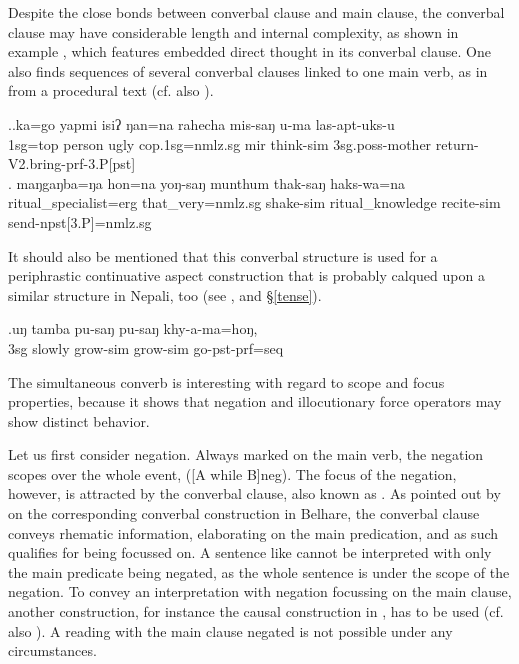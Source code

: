 Despite the close bonds between converbal clause and main clause, the converbal clause may have considerable length and internal complexity, as shown in example \Next[a], which features embedded direct thought in its converbal clause. One also finds sequences of several converbal clauses linked to one main verb, as in \Next[b] from a procedural text (cf. also \Last[b]).

	\ex.\ag.ka=go   yapmi isiʔ ŋan=na   rahecha mis-saŋ  u-ma    las-apt-uks-u\\
	{\sc 1sg=top} person ugly   {\sc cop.1sg=nmlz.sg}  {\sc mir} think{\sc -sim} {\sc 3sg.poss-}mother   return{\sc -V2.bring-prf-3.P[pst]}\\
	 
	\bg. maŋgaŋba=ŋa   hon=na      yoŋ-saŋ     munthum   thak-saŋ         haks-wa=na\\
		ritual\_specialist{\sc =erg} that\_very{\sc =nmlz.sg} shake{\sc -sim} ritual\_knowledge recite{\sc -sim} send{\sc -npst[3.P]=nmlz.sg}\\
		 
	
It should also be mentioned that this converbal structure is  used for a periphrastic continuative aspect construction that is probably calqued upon a similar structure in Nepali, too (see \Next, and §\ref{tense}).

\exg.uŋ tamba  pu-saŋ     pu-saŋ    khy-a-ma=hoŋ,  \\
		{\sc 3sg} slowly grow{\sc -sim} grow{\sc -sim} go{\sc [3sg]-pst-prf=seq}\\
		 	


The simultaneous converb is interesting with regard to scope and focus properties, because it shows that negation and illocutionary force operators may show distinct behavior. 

Let us first consider negation. Always marked on the main verb, the negation scopes over the whole event, ([A while B]{\sc neg}). The focus of the negation, however, is attracted by the converbal clause, also known as  \citep{Horn1989A-natural}. As pointed out by \citet{Bickel1993Belhare} on the corresponding converbal construction in Belhare, the converbal clause conveys rhematic information, elaborating on the main predication, and as such qualifies for being focussed on. A sentence like \Next[a] cannot be interpreted with only the main predicate being  negated, as the whole sentence is under the  scope  of the negation. To convey an interpretation with negation focussing on the main clause, another construction, for instance the causal construction in \Next[b], has to be used (cf. also \citet{Bierkandtetal_Scope}). A reading with the main clause negated is not possible under any circumstances.

